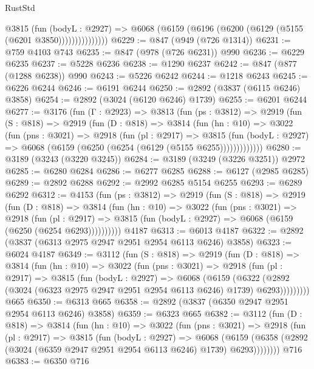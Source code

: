 \begin{lexlean}{RustStd}
\begin{coremodule}
                  @3815
                    (fun (bodyL : @2927) =>
                    @6068 (@6159 (@6196 (@6200 (@6129 (@5155 (@6201 @3850)))))))))))))))
@6229 := @847 (@949 (@726 @1314))
@6231 := @759 @4103 @743
@6235 := @847 (@978 (@726 @6231)) @990
@6236 := @6229 @6235
@6237 := @5228 @6236
@6238 := @1290 @6237
@6242 := @847 (@877 (@1288 @6238)) @990
@6243 := @5226 @6242
@6244 := @1218 @6243
@6245 := @6226 @6244
@6246 := @6191 @6244
@6250 := @2892 (@3837 (@6115 @6246) @3858)
@6254 := @2892 (@3024 (@6120 @6246) @1739)
@6255 := @6201 @6244
@6277 := @3176
    (fun (Γ : @2923) =>
    @3813
      (fun (ps : @3812) =>
      @2919
        (fun (S : @818) =>
        @2919
          (fun (D : @818) =>
          @3814
            (fun (hn : @10) =>
            @3022
              (fun (pns : @3021) =>
              @2918
                (fun (pl : @2917) =>
                @3815
                  (fun (bodyL : @2927) =>
                  @6068 (@6159 (@6250 (@6254 (@6129 (@5155 @6255)))))))))))))
@6280 := @3189 (@3243 (@3220 @3245))
@6284 := @3189 (@3249 (@3226 @3251)) @2972
@6285 := @6280 @6284
@6286 := @6277 @6285
@6288 := @6127 (@2985 @6285)
@6289 := @2892 @6288
@6292 := @2992 @6285 @5154 @6255
@6293 := @6289 @6292
@6312 := @4153
    (fun (ps : @3812) =>
    @2919
      (fun (S : @818) =>
      @2919
        (fun (D : @818) =>
        @3814
          (fun (hn : @10) =>
          @3022
            (fun (pns : @3021) =>
            @2918
              (fun (pl : @2917) =>
              @3815 (fun (bodyL : @2927) => @6068 (@6159 (@6250 (@6254 @6293))))))))))
    @4187
@6313 := @6013 @4187
@6322 := @2892 (@3837 (@6313 @2975 @2947 @2951 @2954 @6113 @6246) @3858)
@6323 := @6024 @4187
@6349 := @3112
    (fun (S : @818) =>
    @2919
      (fun (D : @818) =>
      @3814
        (fun (hn : @10) =>
        @3022
          (fun (pns : @3021) =>
          @2918
            (fun (pl : @2917) =>
            @3815
              (fun (bodyL : @2927) =>
              @6068
                (@6159
                  (@6322
                    (@2892 (@3024 (@6323 @2975 @2947 @2951 @2954 @6113 @6246) @1739) @6293)))))))))
    @665
@6350 := @6313 @665
@6358 := @2892 (@3837 (@6350 @2947 @2951 @2954 @6113 @6246) @3858)
@6359 := @6323 @665
@6382 := @3112
    (fun (D : @818) =>
    @3814
      (fun (hn : @10) =>
      @3022
        (fun (pns : @3021) =>
        @2918
          (fun (pl : @2917) =>
          @3815
            (fun (bodyL : @2927) =>
            @6068
              (@6159 (@6358 (@2892 (@3024 (@6359 @2947 @2951 @2954 @6113 @6246) @1739) @6293))))))))
    @716
@6383 := @6350 @716

\end{coremodule}
\end{lexlean}
